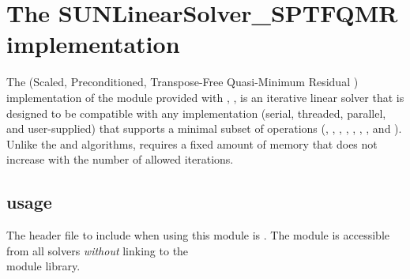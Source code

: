 \section{The SUNLinearSolver\_SPTFQMR implementation}\label{ss:sunlinsol_sptfqmr}

The {\sptfqmr} (Scaled, Preconditioned, Transpose-Free Quasi-Minimum
Residual \cite{Fre:93}) implementation of the {\sunlinsol} module
provided with {\sundials}, {\sunlinsolsptfqmr}, is an iterative linear
solver that is designed to be compatible with any {\nvector}
implementation (serial, threaded, parallel, and user-supplied) that
supports a minimal subset of operations (,
, , , ,
, , and ).  Unlike the
{\spgmr} and {\spfgmr} algorithms, {\sptfqmr} requires a fixed amount of
memory that does not increase with the number of allowed iterations.

\subsection{{\sunlinsolsptfqmr} usage}\label{ss:sunlinsol_sptfqmr_usage}

The header file to include when using this module
is . The {\sunlinsolsptfqmr} module
is accessible from all {\sundials} solvers \textit{without}
linking to the \\ \noindent
{} module library.



